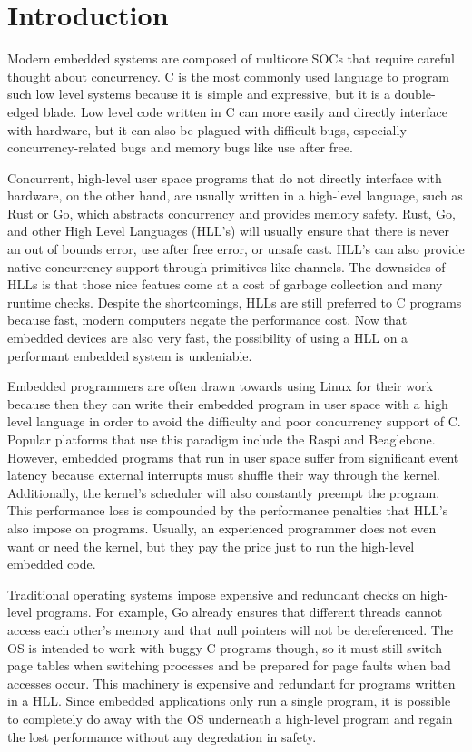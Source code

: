 
\chapter{Introduction}

Modern embedded systems are composed of multicore SOCs that require
careful thought about concurrency. C is the
most commonly used language to program such low level systems because
it is simple and expressive, but it is
a double-edged blade. Low level code written in C can more easily and
directly interface with hardware, but it can also be plagued with
difficult bugs, especially concurrency-related bugs and memory bugs like
use after free.

Concurrent, high-level user space programs that do not directly interface with
hardware, on the other hand, are usually written in a
high-level language, such as Rust or Go, which abstracts concurrency
and provides memory safety. Rust, Go, and other High Level Languages (HLL's)
will usually ensure that there is never an out of bounds error, use
after free error, or unsafe cast. HLL's can also provide native concurrency
support through primitives like channels. The downsides of HLLs is that those
nice featues come at a cost of garbage collection and many runtime checks.
Despite the shortcomings, HLLs are still preferred to C programs because fast,
modern computers negate the performance cost. Now that embedded devices are also very fast,
the possibility of using a HLL on a performant embedded system is undeniable.

Embedded programmers are often drawn towards using Linux for their work
because then they can write their embedded program in user space with a
high level language in order to avoid the difficulty and poor concurrency
support of C. Popular platforms that use this paradigm include
the Raspi and Beaglebone. However, embedded programs that run in user space suffer
from significant event latency because external interrupts
must shuffle their way through the kernel. Additionally, the kernel's scheduler
will also constantly preempt the program. This performance loss is compounded by the
performance penalties that HLL's also impose on programs.
Usually, an experienced programmer does not even want or need the
kernel, but they pay the price just to run the high-level embedded code.

Traditional operating systems impose expensive and redundant checks on
high-level programs. For example,
Go already ensures that different threads cannot access each other's memory and that null pointers
will not be dereferenced. The OS is intended to work with buggy C programs though, so it must still switch
page tables when switching processes and be prepared for page faults when bad accesses occur. This machinery
is expensive and redundant for programs written in a HLL. Since embedded applications only run a single
program, it is possible to completely do away with the OS underneath a high-level program and regain the
lost performance without any degredation in safety.

